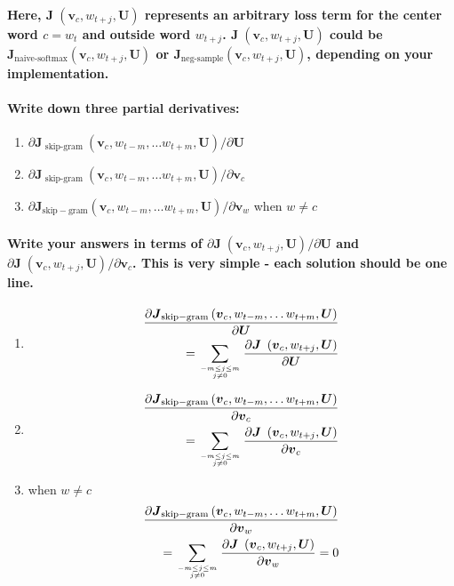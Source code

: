 \documentclass[12pt, letterpaper]{article}
\newcommand{\Jskipgram}{\boldsymbol{J}_{\mathrm{skip-gram}}\left(\boldsymbol{v}_{c}, w_{t-m}, \ldots w_{t+m}, \boldsymbol{U}\right)} %
\newcommand{\singleskipgram}[1]{\boldsymbol{J}_{\text{#1}}\left(\boldsymbol{v}_{c}, w_{t+j}, \boldsymbol{U}\right)}
\newcommand{\partialD}[2]{\frac{\partial #1}{\partial #2}}
\begin{document}
\paragraph{Here, $\singleskipgram{~}$ represents an arbitrary loss term for the center word $c = w_t$ and outside word $w_{t+j}$. $\singleskipgram{~}$ could be $\singleskipgram{naive-softmax}$ or $\singleskipgram{neg-sample}$, depending on your implementation.}
\paragraph{Write down three partial derivatives:}
\begin{enumerate}
    \item $\partial \boldsymbol{J}_{\text { skip-gram }}\left(\boldsymbol{v}_{c}, w_{t-m}, \ldots w_{t+m}, \boldsymbol{U}\right) / \partial \boldsymbol{U}$
    \item $\partial \boldsymbol{J}_{\text { skip-gram }}\left(\boldsymbol{v}_{c}, w_{t-m}, \ldots w_{t+m}, \boldsymbol{U}\right) / \partial \boldsymbol{v}_{c}$
    \item $\partial \boldsymbol{J}_{\mathrm{skip-gram}}\left(\boldsymbol{v}_{c}, w_{t-m}, \ldots w_{t+m}, \boldsymbol{U}\right) / \partial \boldsymbol{v}_{w}$ when $w \neq c$
\end{enumerate}
\paragraph{Write your answers in terms of $\partial \singleskipgram{~} / \partial \boldsymbol{U}$ and $\partial \singleskipgram{~} / \partial \boldsymbol{v}_{c}$. This is very simple - each solution should be one line.}

\begin{enumerate}
    \item {
        \begin{align*}
            \partialD{\Jskipgram}{\boldsymbol{U}} \\
            = \sum_{-m \leq j \leq m \atop j \neq 0} \partialD{\singleskipgram{~}}{\boldsymbol{U}}
        \end{align*}
    }
    \item {
        \begin{align*}
            \partialD{\Jskipgram}{\boldsymbol{v}_c} \\
            = \sum_{-m \leq j \leq m \atop j \neq 0} \partialD{\singleskipgram{~}}{\boldsymbol{v}_c} \\
        \end{align*}
    }
    \item when $w \neq c$ {
        \begin{align*}
            \partialD{\Jskipgram}{\boldsymbol{v}_w}  \\
            = \sum_{-m \leq j \leq m \atop j \neq 0} \partialD{\singleskipgram{~}}{\boldsymbol{v}_w} = 0 \\
        \end{align*}
    }
\end{enumerate}
\end{document}

